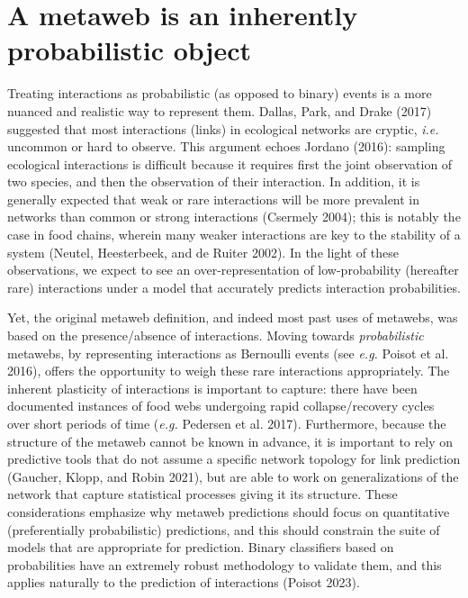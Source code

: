 \documentclass[
  letterpaper,
  DIV=11,
  numbers=noendperiod]{scrartcl}
\begin{document}
\hypertarget{a-metaweb-is-an-inherently-probabilistic-object}{%
\section{A metaweb is an inherently probabilistic
object}\label{a-metaweb-is-an-inherently-probabilistic-object}}

Treating interactions as probabilistic (as opposed to binary) events is
a more nuanced and realistic way to represent them. Dallas, Park, and
Drake (2017) suggested that most interactions (links) in ecological
networks are cryptic, \emph{i.e.} uncommon or hard to observe. This
argument echoes Jordano (2016): sampling ecological interactions is
difficult because it requires first the joint observation of two
species, and then the observation of their interaction. In addition, it
is generally expected that weak or rare interactions will be more
prevalent in networks than common or strong interactions (Csermely
2004); this is notably the case in food chains, wherein many weaker
interactions are key to the stability of a system (Neutel, Heesterbeek,
and de Ruiter 2002). In the light of these observations, we expect to
see an over-representation of low-probability (hereafter rare)
interactions under a model that accurately predicts interaction
probabilities.

Yet, the original metaweb definition, and indeed most past uses of
metawebs, was based on the presence/absence of interactions. Moving
towards \emph{probabilistic} metawebs, by representing interactions as
Bernoulli events (see \emph{e.g.} Poisot et al. 2016), offers the
opportunity to weigh these rare interactions appropriately. The inherent
plasticity of interactions is important to capture: there have been
documented instances of food webs undergoing rapid collapse/recovery
cycles over short periods of time (\emph{e.g.} Pedersen et al. 2017).
Furthermore, because the structure of the metaweb cannot be known in
advance, it is important to rely on predictive tools that do not assume
a specific network topology for link prediction (Gaucher, Klopp, and
Robin 2021), but are able to work on generalizations of the network that
capture statistical processes giving it its structure. These
considerations emphasize why metaweb predictions should focus on
quantitative (preferentially probabilistic) predictions, and this should
constrain the suite of models that are appropriate for prediction.
Binary classifiers based on probabilities have an extremely robust
methodology to validate them, and this applies naturally to the
prediction of interactions (Poisot 2023).
\end{document}
